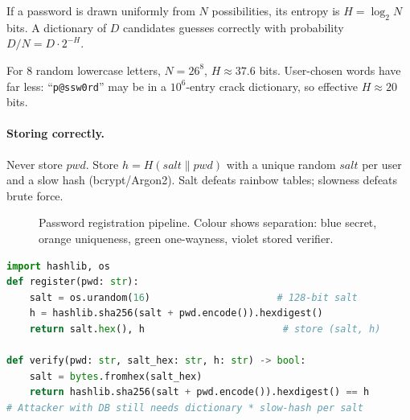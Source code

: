 \begin{definition}
If a password is drawn uniformly from $N$ possibilities, its entropy is $H=\log_2 N$ bits. A dictionary of $D$ candidates guesses correctly with probability $D/N= D\cdot 2^{-H}$.
\end{definition}
For 8 random lowercase letters, $N=26^8$, $H\approx 37.6$ bits. User-chosen words have far less: ``\texttt{p@ssw0rd}'' may be in a $10^6$-entry crack dictionary, so effective $H\approx 20$ bits.

\paragraph{Storing correctly.} Never store $pwd$. Store $h=H(salt\parallel pwd)$ with a unique random $salt$ per user and a slow hash (bcrypt/Argon2). Salt defeats rainbow tables; slowness defeats brute force.

\begin{figure}[h]\centering
{}
\caption{Password registration pipeline. Colour shows separation: blue secret, orange uniqueness, green one-wayness, violet stored verifier.}
\label{fig:pwd-pipeline}
\end{figure}

\begin{lstlisting}[language=Python,caption={Toy salted hashing. Production: use bcrypt/Argon2 with work factor.},label={lst:pwdhash}]
import hashlib, os
def register(pwd: str):
    salt = os.urandom(16)                      # 128-bit salt
    h = hashlib.sha256(salt + pwd.encode()).hexdigest()
    return salt.hex(), h                        # store (salt, h)

def verify(pwd: str, salt_hex: str, h: str) -> bool:
    salt = bytes.fromhex(salt_hex)
    return hashlib.sha256(salt + pwd.encode()).hexdigest() == h
# Attacker with DB still needs dictionary * slow-hash per salt
\end{lstlisting}

